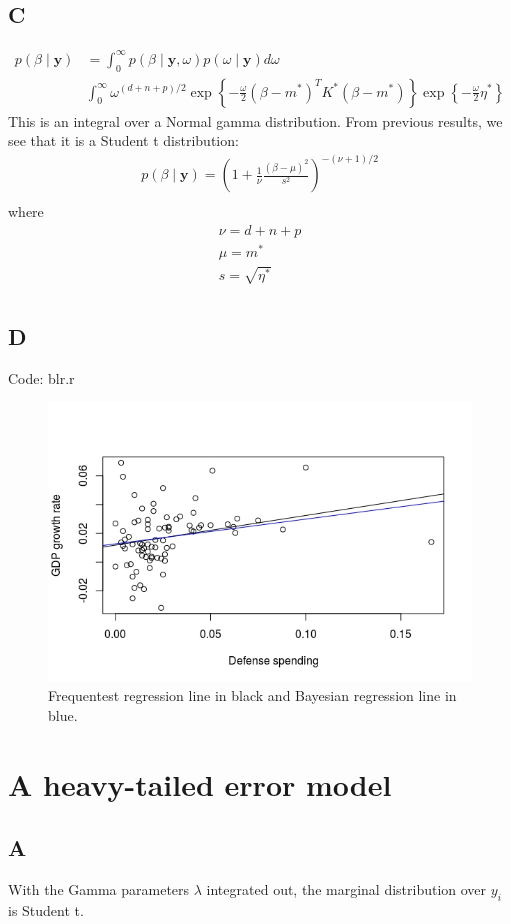 \documentclass{article}
\begin{document}
\subsection*{C}
\begin{align*}
p(\beta \mid \mathbf{y}) &= \int_{0}^{\infty} p(\beta \mid \mathbf{y}, \omega) p(\omega \mid \mathbf{y}) d\omega\\
& \int_{0}^{\infty} \omega^{(d+n+p)/2} \exp \left\lbrace -\frac{\omega}{2}(\beta - m^*)^T K^* (\beta - m^*) \right\rbrace \exp \left\lbrace -\frac{\omega}{2} \eta^* \right\rbrace
\end{align*}
This is an integral over a Normal gamma distribution. From previous results, we see that it is a Student t distribution:
\begin{align*}
p(\beta \mid \mathbf{y}) = \left(1 + \frac{1}{\nu}\frac{(\beta-\mu)^2}{s^2}\right)^{-(\nu+1)/2}\\
\end{align*}
where 
\begin{align*}
\nu = d + n + p\\
\mu = m^*\\
s = \sqrt{\eta^*}\\
\end{align*}

\subsection*{D}
Code: blr.r
\begin{figure}[h!]
\includegraphics[width=\linewidth]{blm.jpeg}
\caption{Frequentest regression line in black and Bayesian regression line in blue.}
\end{figure}


\section*{A heavy-tailed error model}
\subsection*{A}
With the Gamma parameters \(\lambda\) integrated out, the marginal distribution over \(y_i\) is Student t.
\end{document}
